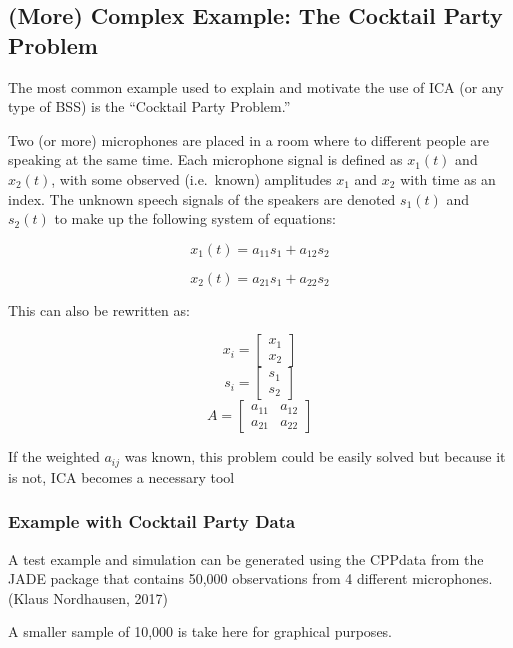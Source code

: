 \documentclass[12pt,twoside]{amherstthesis}
\begin{document}
  \subsection{(More) Complex Example: The Cocktail Party
  Problem}\label{more-complex-example-the-cocktail-party-problem}
  
  The most common example used to explain and motivate the use of ICA (or
  any type of BSS) is the ``Cocktail Party Problem.''
  
  Two (or more) microphones are placed in a room where to different people
  are speaking at the same time. Each microphone signal is defined as
  \(x_1(t)\) and \(x_2(t)\), with some observed (i.e.~known) amplitudes
  \(x_1\) and \(x_2\) with time as an index. The unknown speech signals of
  the speakers are denoted \(s_1(t)\) and \(s_2(t)\) to make up the
  following system of equations:
  
  \[ x_1(t) = a_{11}s_1 +a_{12}s_2 \]
  
  \[ x_2(t) = a_{21}s_1 +a_{22}s_2 \]
  
  This can also be rewritten as:
  
  \[x_i = \begin{bmatrix} x_1 \\ x_2 \end{bmatrix}\]
  \[s_i = \begin{bmatrix} s_1 \\ s_2 \end{bmatrix}\]
  \[A = \begin{bmatrix} a_{11} & a_{12} \\ a_{21} & a_{22}  \end{bmatrix}\]
  
  If the weighted \(a_{ij}\) was known, this problem could be easily
  solved but because it is not, ICA becomes a necessary tool
  
  \subsubsection{Example with Cocktail Party
  Data}\label{example-with-cocktail-party-data}
  
  A test example and simulation can be generated using the CPPdata from
  the JADE package that contains 50,000 observations from 4 different
  microphones. (Klaus Nordhausen, 2017)
  
  A smaller sample of 10,000 is take here for graphical purposes.
  
\end{document}

